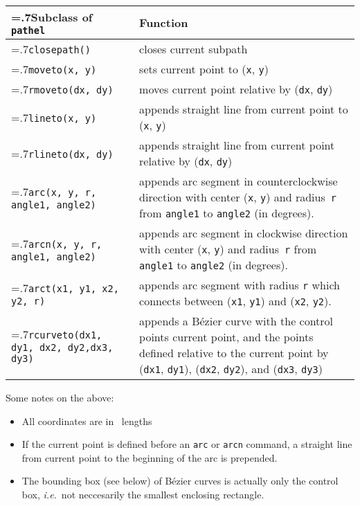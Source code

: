 \medskip
\begin{tabularx}{\linewidth}{>{\hsize=.7\hsize}X>{\raggedright\arraybackslash\hsize=1.3\hsize}X}
Subclass of \texttt{pathel} & Function \\
\hline
\texttt{closepath()} & closes current subpath \\
\texttt{moveto(x, y)} & sets current point to (\texttt{x},
\texttt{y})\\
\texttt{rmoveto(dx, dy)} & moves current point relative by (\texttt{dx},
\texttt{dy})\\
\texttt{lineto(x, y)} & appends straight line from current point to
(\texttt{x}, \texttt{y})\\
\texttt{rlineto(dx, dy)} & appends straight line from current point
relative by (\texttt{dx}, \texttt{dy})\\
\texttt{arc(x, y, r, \newline\phantom{arc(}angle1, angle2)} & appends arc segment in
counterclockwise direction with center (\verb|x|, \verb|y|) and
radius~\verb|r| from \verb|angle1| to \verb|angle2| (in degrees).\\
\texttt{arcn(x, y, r, \newline\phantom{arcn(}angle1, angle2)} & appends arc segment in
clockwise direction with center (\verb|x|, \verb|y|) and
radius~\verb|r| from \verb|angle1| to \verb|angle2| (in degrees). \\
\texttt{arct(x1, y1, x2, y2, r)} & appends arc segment with radius \verb|r|
which connects between (\verb|x1|, \verb|y1|) and (\verb|x2|,
\verb|y2|).\\
\texttt{rcurveto(dx1, dy1, \newline\phantom{rcurveto(}dx2, dy2,\newline\phantom{rcurveto(}dx3, dy3)} & appends a B\'ezier curve with
the control points current point, and the points defined relative to
the current point by (\verb|dx1|, \verb|dy1|), 
(\verb|dx2|, \verb|dy2|), and (\verb|dx3|, \verb|dy3|)
\end{tabularx}
\medskip

Some notes on the above:
\begin{itemize}
\item All coordinates are in \PyX\ lengths
\item If the current point is defined before an \verb|arc| or
  \verb|arcn| command, a straight line from current point to the
  beginning of the arc is prepended.
\item The bounding box (see below) of B\'ezier curves is actually only
  the control box, \textit{i.e.}\ not neccesarily the smallest
  enclosing rectangle.
\end{itemize}


